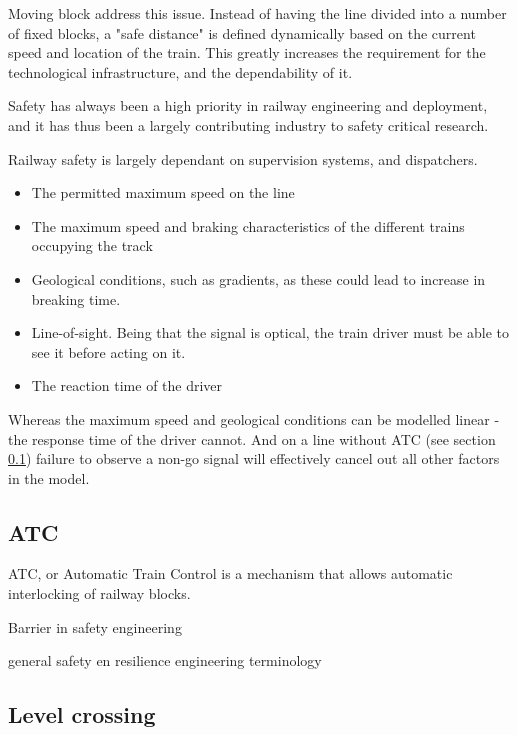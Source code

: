 Moving block address this issue. Instead of having the line divided into a number of fixed blocks, a "safe distance" is defined dynamically based on the current speed and location of the train.
This greatly increases the requirement for the technological infrastructure, and the dependability of it.

Safety has always been a high priority in railway engineering and deployment, and it has thus been a largely contributing industry to safety critical research.

Railway safety is largely dependant on supervision systems, and dispatchers.

\begin{itemize}
  \item The permitted maximum speed on the line
  \item The maximum speed and braking characteristics of the different trains occupying the track
  \item Geological conditions, such as gradients, as these could lead to increase in breaking time.
  \item Line-of-sight. Being that the signal is optical, the train driver must be able to see it before acting on it.
  \item The reaction time of the driver
\end{itemize}
Whereas the maximum speed and geological conditions can be modelled linear - the response time of the driver cannot. And on a line without ATC (see section \ref{sec:atc}) failure to observe a non-go signal will effectively cancel out all other factors in the model.

\subsection{ATC}
\label{sec:atc}
ATC, or Automatic Train Control is a mechanism that allows automatic interlocking of railway blocks.

Barrier in safety engineering

general safety en resilience engineering terminology



\subsection{Level crossing}

